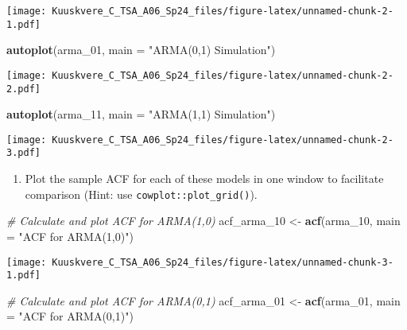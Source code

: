 \documentclass[
]{article}
\newenvironment{Shaded}{\begin{snugshade}}{\end{snugshade}}
\newcommand{\AttributeTok}[1]{\textcolor[rgb]{0.13,0.29,0.53}{#1}}
\newcommand{\CommentTok}[1]{\textcolor[rgb]{0.56,0.35,0.01}{\textit{#1}}}
\newcommand{\FunctionTok}[1]{\textcolor[rgb]{0.13,0.29,0.53}{\textbf{#1}}}
\newcommand{\NormalTok}[1]{#1}
\newcommand{\OtherTok}[1]{\textcolor[rgb]{0.56,0.35,0.01}{#1}}
\newcommand{\StringTok}[1]{\textcolor[rgb]{0.31,0.60,0.02}{#1}}
\providecommand{\tightlist}{%
  \setlength{\itemsep}{0pt}\setlength{\parskip}{0pt}}
\begin{document}
\texttt{[image: Kuuskvere\_C\_TSA\_A06\_Sp24\_files/figure-latex/unnamed-chunk-2-1.pdf]}

\begin{Shaded}
\begin{Highlighting}[]
\FunctionTok{autoplot}\NormalTok{(arma\_01, }\AttributeTok{main =} \StringTok{"ARMA(0,1) Simulation"}\NormalTok{) }
\end{Highlighting}
\end{Shaded}

\texttt{[image: Kuuskvere\_C\_TSA\_A06\_Sp24\_files/figure-latex/unnamed-chunk-2-2.pdf]}

\begin{Shaded}
\begin{Highlighting}[]
\FunctionTok{autoplot}\NormalTok{(arma\_11, }\AttributeTok{main =} \StringTok{"ARMA(1,1) Simulation"}\NormalTok{) }
\end{Highlighting}
\end{Shaded}

\texttt{[image: Kuuskvere\_C\_TSA\_A06\_Sp24\_files/figure-latex/unnamed-chunk-2-3.pdf]}

\begin{enumerate}
\def\labelenumi{(\alph{enumi})}
\setcounter{enumi}{1}
\tightlist
\item
  Plot the sample ACF for each of these models in one window to
  facilitate comparison (Hint: use \texttt{cowplot::plot\_grid()}).
\end{enumerate}

\begin{Shaded}
\begin{Highlighting}[]
\CommentTok{\# Calculate and plot ACF for ARMA(1,0)}
\NormalTok{acf\_arma\_10 }\OtherTok{\textless{}{-}} \FunctionTok{acf}\NormalTok{(arma\_10, }\AttributeTok{main =} \StringTok{"ACF for ARMA(1,0)"}\NormalTok{)}
\end{Highlighting}
\end{Shaded}

\texttt{[image: Kuuskvere\_C\_TSA\_A06\_Sp24\_files/figure-latex/unnamed-chunk-3-1.pdf]}

\begin{Shaded}
\begin{Highlighting}[]
\CommentTok{\# Calculate and plot ACF for ARMA(0,1)}
\NormalTok{acf\_arma\_01 }\OtherTok{\textless{}{-}} \FunctionTok{acf}\NormalTok{(arma\_01, }\AttributeTok{main =} \StringTok{"ACF for ARMA(0,1)"}\NormalTok{)}
\end{Highlighting}
\end{Shaded}
\end{document}
